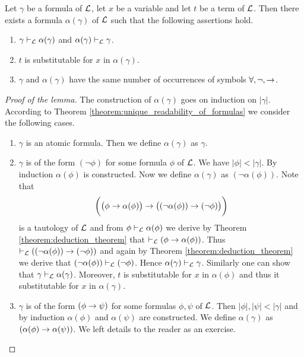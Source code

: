 \begin{lemma}\label{lemma:alphabetic_variants}
Let $\gamma$ be a formula of ${\mathcal L}$, let $x$ be a variable and let $t$ be a term of ${\mathcal L}$. Then there exists a formula $\alpha(\gamma)$ of ${\mathcal L}$ such that the following assertions hold.
\begin{enumerate}[label=\emph{\textbf{(\arabic*)}}, leftmargin=3.0em]
\item $\gamma \vdash_{{\mathcal L}} \alpha(\gamma)$ and $\alpha(\gamma) \vdash_{{\mathcal L}} \gamma$.
\item $t$ is substitutable for $x$ in $\alpha(\gamma)$.
\item $\gamma$ and $\alpha(\gamma)$ have the same number of occurrences of symbols $\forall , \neg, \rightarrow$.
\end{enumerate}
\end{lemma}
\begin{proof}[Proof of the lemma]
The construction of $\alpha(\gamma)$ goes on induction on $|\gamma|$. According to Theorem \ref{theorem:unique_readability_of_formulas} we consider the following cases.
\begin{enumerate}[label=\textbf{(\arabic*)}, leftmargin=3.0em]
\item $\gamma$ is an atomic formula. Then we define $\alpha(\gamma)$ as $\gamma$.
\item $\gamma$ is of the form $(\neg\phi)$ for some formula $\phi$ of ${\mathcal L}$. We have $|\phi| < |\gamma|$. By induction $\alpha(\phi)$ is constructed. Now we define $\alpha(\gamma)$ as $\left(\neg\alpha(\phi)\right)$. Note that
$$\bigg(\big(\phi \rightarrow \alpha(\phi)\big) \rightarrow \big((\neg\alpha(\phi)) \rightarrow (\neg \phi)\big)\bigg)$$
is a tautology of ${\mathcal L}$ and from $\phi \vdash_{{\mathcal L}} \alpha(\phi)$ we derive by Theorem \ref{theorem:deduction_theorem} that $\vdash_{{\mathcal L}} (\phi \rightarrow \alpha(\phi))$. Thus $\vdash_{{\mathcal L}} ((\neg\alpha(\phi)) \rightarrow (\neg\phi))$ and again by Theorem \ref{theorem:deduction_theorem} we derive that $(\neg\alpha(\phi)) \vdash_{{\mathcal L}} (\neg\phi)$. Hence $\alpha(\gamma) \vdash_{{\mathcal L}} \gamma$. Similarly one can show that $\gamma \vdash_{{\mathcal L}} \alpha(\gamma)$. Moreover, $t$ is substitutable for
$x$ in $\alpha(\phi)$ and thus it substitutable for $x$ in $\alpha(\gamma)$.
\item $\gamma$ is of the form $(\phi \rightarrow \psi)$ for some formulas $\phi, \psi$ of ${\mathcal L}$. Then $|\phi|, |\psi| < |\gamma|$ and by induction $\alpha(\phi)$ and $\alpha(\psi)$ are constructed. We define $\alpha(\gamma)$ as $(\alpha(\phi) \rightarrow \alpha(\psi))$. We left details to the reader as an exercise.

\end{enumerate}
\end{proof}
